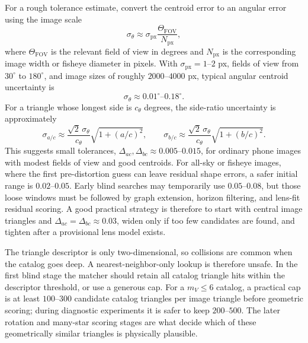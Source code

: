 \documentclass[11pt]{article}
\begin{document}
For a rough tolerance estimate, convert the centroid error to an angular error
using the image scale
\begin{equation}
  \sigma_\theta \approx \sigma_{\mathrm{px}}
  \frac{\Theta_{\mathrm{FOV}}}{N_{\mathrm{px}}},
\end{equation}
where \(\Theta_{\mathrm{FOV}}\) is the relevant field of view in degrees and
\(N_{\mathrm{px}}\) is the corresponding image width or fisheye diameter in
pixels. With \(\sigma_{\mathrm{px}}=1\)--\(2\) px, fields of view from
\(30^\circ\) to \(180^\circ\), and image sizes of roughly \(2000\)--\(4000\)
px, typical angular centroid uncertainty is
\begin{equation}
  \sigma_\theta \approx 0.01^\circ\text{--}0.18^\circ .
\end{equation}
For a triangle whose longest side is \(c_\theta\) degrees, the side-ratio
uncertainty is approximately
\begin{equation}
  \sigma_{a/c} \approx
  \frac{\sqrt{2}\,\sigma_\theta}{c_\theta}
  \sqrt{1+(a/c)^2},
  \qquad
  \sigma_{b/c} \approx
  \frac{\sqrt{2}\,\sigma_\theta}{c_\theta}
  \sqrt{1+(b/c)^2}.
\end{equation}
This suggests small tolerances,
\(\Delta_{ac},\Delta_{bc}\approx 0.005\)--\(0.015\), for ordinary phone images
with modest fields of view and good centroids. For all-sky or fisheye images,
where the first pre-distortion guess can leave residual shape errors, a safer
initial range is \(0.02\)--\(0.05\). Early blind searches may temporarily use
\(0.05\)--\(0.08\), but those loose windows must be followed by graph
extension, horizon filtering, and lens-fit residual scoring. A good practical
strategy is therefore to start with central image triangles and
\(\Delta_{ac}=\Delta_{bc}\approx 0.03\), widen only if too few candidates are
found, and tighten after a provisional lens model exists.

The triangle descriptor is only two-dimensional, so collisions are common when
the catalog goes deep. A nearest-neighbor-only lookup is therefore unsafe. In
the first blind stage the matcher should retain all catalog triangle hits
within the descriptor threshold, or use a generous cap. For a \(m_V\le6\)
catalog, a practical cap is at least \(100\)--\(300\) candidate catalog
triangles per image triangle before geometric scoring; during diagnostic
experiments it is safer to keep \(200\)--\(500\). The later rotation and
many-star scoring stages are what decide which of these geometrically similar
triangles is physically plausible.
\end{document}

